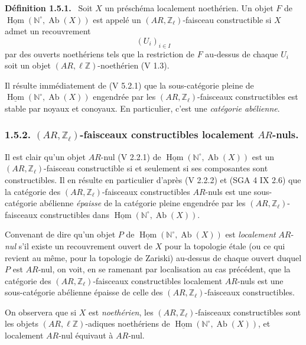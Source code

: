 \documentclass[11pt]{article}
\newenvironment{statement}[1]{\par\medskip\noindent\textbf{#1.}\ }{\par\medskip}
\DeclareMathOperator{\Hom}{Hom}
\providecommand{\uHom}{\underline{\Hom}}
\providecommand{\Hom}{\operatorname{Hom}}
\providecommand{\Ab}{\operatorname{Ab}}
\providecommand{\Ab}{\operatorname{Ab}}
\providecommand{\Hom}{\operatorname{Hom}}
\begin{document}
\begin{statement}{Définition 1.5.1}
Soit \(X\) un préschéma localement noethérien. Un objet \(F\) de \(\uHom(\mathbb N^\circ,\Ab(X))\) est appelé un \((AR,\mathbb Z_\ell)\)-faisceau constructible si \(X\) admet un recouvrement
\[
(U_i)_{i\in I}
\]
par des
ouverts noethériens tels que la restriction de \(F\) au-dessus de chaque \(U_i\) soit un objet \((AR,\ell\mathbb Z)\)-noethérien (V 1.3).
\end{statement}

Il résulte immédiatement de (V 5.2.1) que la sous-catégorie pleine de \(\uHom(\mathbb N^\circ,\Ab(X))\) engendrée par les \((AR,\mathbb Z_\ell)\)-faisceaux constructibles est stable par noyaux et conoyaux. En particulier, c'est une \emph{catégorie abélienne}.

\subsubsection*{1.5.2. \((AR,\mathbb Z_\ell)\)-faisceaux constructibles localement \(AR\)-nuls.}

Il est clair qu'un objet \(AR\)-nul (V 2.2.1) de \(\uHom(\mathbb N^\circ,\Ab(X))\) est un \((AR,\mathbb Z_\ell)\)-faisceau constructible si et seulement si ses composantes sont constructibles. Il en résulte en particulier d'après (V 2.2.2) et (SGA 4 IX 2.6) que la catégorie des \((AR,\mathbb Z_\ell)\)-faisceaux constructibles \(AR\)-nuls est une sous-catégorie abélienne \emph{épaisse} de la catégorie pleine engendrée par les \((AR,\mathbb Z_\ell)\)-faisceaux constructibles dans \(\uHom(\mathbb N^\circ,\Ab(X))\).

Convenant de dire qu'un objet \(P\) de \(\uHom(\mathbb N^\circ,\Ab(X))\) est \emph{localement} \(AR\)-\emph{nul} s'il existe un recouvrement ouvert de \(X\) pour la topologie étale (ou ce qui revient au même, pour la topologie de Zariski) au-dessus de chaque ouvert duquel \(P\) est \(AR\)-nul, on voit, en se ramenant par localisation au cas précédent, que la catégorie des \((AR,\mathbb Z_\ell)\)-faisceaux constructibles localement \(AR\)-nuls est une sous-catégorie abélienne épaisse de celle des \((AR,\mathbb Z_\ell)\)-faisceaux constructibles.

On observera que si \(X\) est \emph{noethérien}, les \((AR,\mathbb Z_\ell)\)-faisceaux constructibles sont les objets \((AR,\ell\mathbb Z)\)-adiques noethériens de \(\uHom(\mathbb N^\circ,\Ab(X))\), et localement \(AR\)-nul équivaut à \(AR\)-nul.
\end{document}
